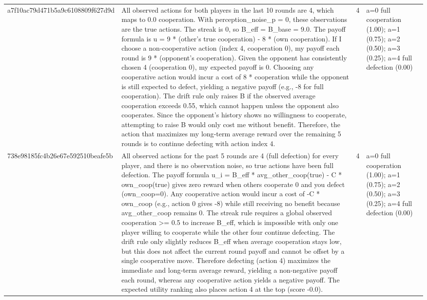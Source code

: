 \begin{tabular}{lp{8cm}ll l}
a7f10ac79d471b5a9c6108809f627d9d & All observed actions for both players in the last 10 rounds are 4, which maps to 0.0 cooperation. With perception\_noise\_p = 0, these observations are the true actions. The streak is 0, so B\_eff = B\_base = 9.0. The payoff formula is u = 9 * (other's true cooperation) - 8 * (own cooperation). If I choose a non‑cooperative action (index 4, cooperation 0), my payoff each round is 9 * (opponent's cooperation). Given the opponent has consistently chosen 4 (cooperation 0), my expected payoff is 0. Choosing any cooperative action would incur a cost of 8 * cooperation while the opponent is still expected to defect, yielding a negative payoff (e.g., -8 for full cooperation). The drift rule only raises B if the observed average cooperation exceeds 0.55, which cannot happen unless the opponent also cooperates. Since the opponent’s history shows no willingness to cooperate, attempting to raise B would only cost me without benefit. Therefore, the action that maximizes my long‑term average reward over the remaining 5 rounds is to continue defecting with action index 4. & 4 & a=0 full cooperation (1.00); a=1 (0.75); a=2 (0.50); a=3 (0.25); a=4 full defection (0.00) &  \\
738e98185fc4b26e67e592510beafe5b & All observed actions for the past 5 rounds are 4 (full defection) for every player, and there is no observation noise, so true actions have been full defection. The payoff formula u\_i = B\_eff * avg\_other\_coop(true) - C * own\_coop(true) gives zero reward when others cooperate 0 and you defect (own\_coop=0). Any cooperative action would incur a cost of -C * own\_coop (e.g., action 0 gives -8) while still receiving no benefit because avg\_other\_coop remains 0. The streak rule requires a global observed cooperation >= 0.5 to increase B\_eff, which is impossible with only one player willing to cooperate while the other four continue defecting. The drift rule only slightly reduces B\_eff when average cooperation stays low, but this does not affect the current round payoff and cannot be offset by a single cooperative move. Therefore defecting (action 4) maximizes the immediate and long‑term average reward, yielding a non‑negative payoff each round, whereas any cooperative action yields a negative payoff. The expected utility ranking also places action 4 at the top (score -0.0). & 4 & a=0 full cooperation (1.00); a=1 (0.75); a=2 (0.50); a=3 (0.25); a=4 full defection (0.00) &  \\

\end{tabular}
